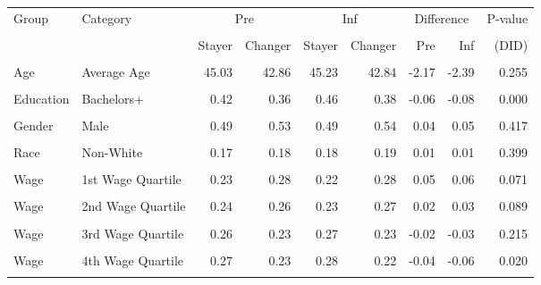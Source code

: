 \begin{tabular}{llrrrrrrr}
\toprule
Group & Category & \multicolumn{2}{c}{Pre} & \multicolumn{2}{c}{Inf} & \multicolumn{2}{c}{Difference} & P-value \\\\
\cmidrule(lr){3-4} \cmidrule(lr){5-6} \cmidrule(lr){7-8}
 & & Stayer & Changer & Stayer & Changer & Pre & Inf & (DID) \\\\
\midrule
Age & Average Age & 45.03 & 42.86 & 45.23 & 42.84 & -2.17 & -2.39 & 0.255 \\\\
Education & Bachelors+ & 0.42 & 0.36 & 0.46 & 0.38 & -0.06 & -0.08 & 0.000 \\\\
Gender & Male & 0.49 & 0.53 & 0.49 & 0.54 & 0.04 & 0.05 & 0.417 \\\\
Race & Non-White & 0.17 & 0.18 & 0.18 & 0.19 & 0.01 & 0.01 & 0.399 \\\\
Wage & 1st Wage Quartile & 0.23 & 0.28 & 0.22 & 0.28 & 0.05 & 0.06 & 0.071 \\\\
Wage & 2nd Wage Quartile & 0.24 & 0.26 & 0.23 & 0.27 & 0.02 & 0.03 & 0.089 \\\\
Wage & 3rd Wage Quartile & 0.26 & 0.23 & 0.27 & 0.23 & -0.02 & -0.03 & 0.215 \\\\
Wage & 4th Wage Quartile & 0.27 & 0.23 & 0.28 & 0.22 & -0.04 & -0.06 & 0.020 \\\\
\bottomrule
\end{tabular}
